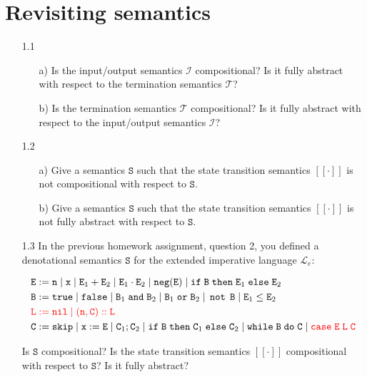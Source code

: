 \documentclass{article}
\newcommand{\E}{\mathtt{E}}
\newcommand{\B}{\mathtt{B}}
\newcommand{\C}{\mathtt{C}}
\newcommand{\LL}{\mathtt{L}}
\newcommand{\true}{\mathtt{true}}
\newcommand{\false}{\mathtt{false}}
\newcommand{\andsym}{\mathtt{and}}
\newcommand{\orsym}{\mathtt{or}}
\newcommand{\notsym}{\mathop{\mathtt{not}}}
\newcommand{\ifsym}{\mathtt{if}}
\newcommand{\then}{\mathtt{then}}
\newcommand{\elsesym}{\mathtt{else}}
\newcommand{\whilesym}{\mathtt{while}}
\newcommand{\dosym}{\mathtt{do}}
\newcommand{\skipsym}{\mathtt{skip}}
\newcommand{\nil}{\mathtt{nil}}
\newcommand{\case}{\mathtt{case}}
\newcommand{\negation}{\mathtt{neg}}
\newcommand{\Sem}{\mathtt{S}}
\newcommand{\question}[1]
{\color{DarkBlue}#1 \color{Black}}
\begin{document}

\section{Revisiting semantics}

\begin{enumerate}
\question{
\item[1.1] 
\begin{enumerate}
	\item[a)] Is the input/output semantics $\mathcal{I}$ compositional? Is it
	fully abstract with respect to the termination semantics $\mathcal{T}$?
	\item[b)] Is the termination semantics $\mathcal{T}$ compositional? Is it
	fully abstract with respect to the input/output semantics $\mathcal{I}$?
\end{enumerate}
}

\question{	
\item[1.2]
\begin{enumerate}
	\item[a)] Give a semantics $\Sem$ such that the state transition semantics 
	$[[\cdot]]$ is not compositional with respect to $\Sem$.
	\item[b)] Give a semantics $\Sem$ such that the state transition semantics 
	$[[\cdot]]$ is not fully abstract with respect to $\Sem$.
\end{enumerate}
}


\question{
\item[1.3] In the previous homework assignment, question 2, you defined a denotational 
semantics $\Sem$ for the extended imperative language $\mathcal{L}_e$:

\begin{align*}
& \E := \mathtt{n} \; | \; \mathtt{x} \; | \; \E_1 + \E_2 \; | \; \E_1 \cdot \E_2 \; | \; \negation(\E) \; | \; \ifsym \; \B \; \then \; \E_1 \; \elsesym \; \E_2 \\ 
& \B := \true \; | \; \false \; | \; \B_1 \; \andsym \; \B_2 \; | \; \B_1 \; \orsym \; \B_2 \; | \; \notsym \; \B \; | \; \E_1 \leq \E_2 \\
& {\color{red} \LL := \nil \; | \; (\mathtt{n},\C)::\LL} \\
& \C := \skipsym \; | \; \mathtt{x} := \E \; | \; \C_1 ; \C_2 \; | \; \ifsym \; \B \; \then \; \C_1 \; \elsesym \; \C_2 \; | \; \whilesym \; \B \; \dosym \; \C \; | \; {\color{red} \case \; \E \; \LL \; \C}
\end{align*}

Is $\Sem$ compositional? Is the state transition semantics $[[\cdot]]$ compositional with respect to $\Sem$? 
Is it fully abstract?
}

\end{enumerate}
\end{document}
